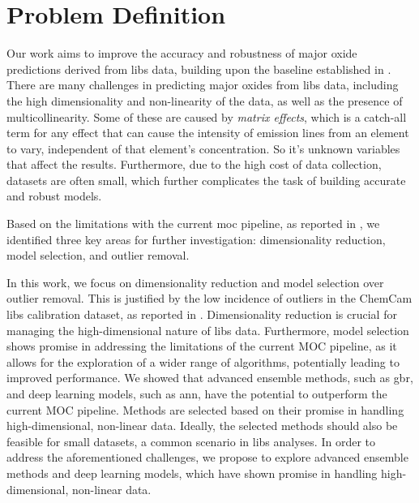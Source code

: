 \section{Problem Definition}
\label{sec:problem_definition}

Our work aims to improve the accuracy and robustness of major oxide predictions derived from \gls{libs} data, building upon the baseline established in \citet{p9_paper}.
There are many challenges in predicting major oxides from \gls{libs} data, including the high dimensionality and non-linearity of the data, as well as the presence of multicollinearity.
Some of these are caused by \textit{matrix effects}\cite{andersonImprovedAccuracyQuantitative2017}, which is a catch-all term for any effect that can cause the intensity of emission lines from an element to vary, independent of that element's concentration. So it's unknown variables that affect the results.
Furthermore, due to the high cost of data collection, datasets are often small, which further complicates the task of building accurate and robust models.

Based on the limitations with the current \gls{moc} pipeline, as reported in \citet{p9_paper}, we identified three key areas for further investigation: dimensionality reduction, model selection, and outlier removal.

In this work, we focus on dimensionality reduction and model selection over outlier removal.
This is justified by the low incidence of outliers in the ChemCam \gls{libs} calibration dataset, as reported in \cite{p9_paper}.
Dimensionality reduction is crucial for managing the high-dimensional nature of \gls{libs} data. %
Furthermore, model selection shows promise in addressing the limitations of the current MOC pipeline, as it allows for the exploration of a wider range of algorithms, potentially leading to improved performance.
We showed that advanced ensemble methods, such as \gls{gbr}, and deep learning models, such as \gls{ann}, have the potential to outperform the current MOC pipeline.
Methods are selected based on their promise in handling high-dimensional, non-linear data. Ideally, the selected methods should also be feasible for small datasets, a common scenario in \gls{libs} analyses. 
In order to address the aforementioned challenges, we propose to explore advanced ensemble methods and deep learning models, which have shown promise in handling high-dimensional, non-linear data.


